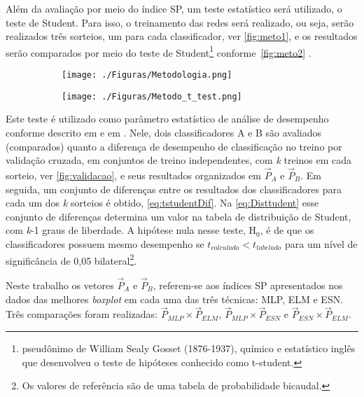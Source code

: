 Além da avaliação por meio do índice SP, um teste estatístico será utilizado, o teste de Student. Para isso, o treinamento das redes será realizado, ou seja, serão realizados três sorteios, um para cada classificador, ver \autoref{fig:meto1}, e os resultados serão comparados por meio do teste de Student\footnote{pseudônimo de  William Sealy Gosset (1876-1937), químico e estatístico inglês que desenvolveu o teste de hipóteses conhecido como t-student.} conforme~\autoref{fig:meto2} \cite{book:kuncheva2004}.

\begin{figure}[H]
	\caption{Representação da metodologia para avaliação dos resultados dos classificadores avaliados, ELM, ESN e MLP.}
	\begin{subfigure}[t]{.5\linewidth}
		\centering
		\label{fig:meto1}
		\texttt{[image: ./Figuras/Metodologia.png]}
	\end{subfigure}
	\begin{subfigure}[t]{.5\linewidth}
		\centering
		\label{fig:meto2}
		\texttt{[image: ./Figuras/Metodo\_t\_test.png]}
	\end{subfigure}
\end{figure}

Este teste é utilizado como parâmetro estatístico de análise de desempenho conforme descrito em  e em . Nele, dois classificadores A e B são avaliados (comparados) quanto a diferença de desempenho de classificação no treino por validação cruzada, em conjuntos de treino independentes, com \textit{k} treinos em cada sorteio, ver \autoref{fig:validacao}, e seus resultados organizados em $\vec{P}_A$ e $\vec{P}_B$. Em seguida, um conjunto de diferenças entre os resultados dos classificadores para cada um dos \textit{k} sorteios é obtido, \autoref{eq:tstudentDif}. Na \autoref{eq:Disttudent} esse conjunto de diferenças determina um valor na tabela de distribuição de Student, com \textit{k}-1 graus de liberdade. A hipótese nula nesse teste, H$_0$, é de que os classificadores possuem mesmo desempenho se $t_{calculado} < t_{tabelado}$ para um nível de significância de 0,05 bilateral\footnote{Os valores de referência são de uma tabela de probabilidade bicaudal.}.

Neste trabalho os vetores $\vec{P}_A$ e $\vec{P}_B$, referem-se aos índices SP apresentados nos dados das melhores \textit{boxplot} em cada uma das três técnicas: MLP, ELM e ESN. Três comparações foram realizadas: $\vec{P}_{MLP} \times \vec{P}_{ELM}$, $\vec{P}_{MLP} \times \vec{P}_{ESN}$ e $\vec{P}_{ESN} \times \vec{P}_{ELM}$.


